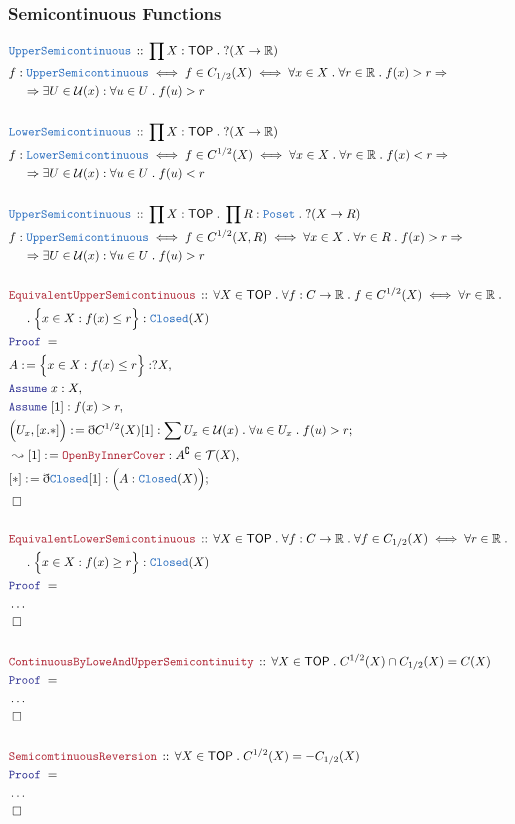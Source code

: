 \documentclass[12pt]{scrartcl}
\newcommand{\TYPE}[1]{\textcolor{NavyBlue}{\mathtt{#1}}}
\newcommand{\LOGIC}[1]{\textcolor{Blue}{\mathtt{#1}}}
\newcommand{\THM}[1]{\textcolor{Maroon}{\mathtt{#1}}}
\renewcommand{\.}{\; . \;}
\newcommand{\de}{: \kern 0.1pc =}
\newcommand{\Theorem}[2]{& \THM{#1} \, :: \, #2 \\ & \Proof = \\ }
\newcommand{\DeclareType}[2]{& \TYPE{#1} \, :: \, #2 \\}
\newcommand{\DefineNamedType}[4]{& #1 : \TYPE{#2} \iff #3 \iff #4 \\}
\newcommand{\NewLine}{\\ & \kern 1pc}
\newcommand{\Page}[1]{ \begin{align*} #1 \end{align*}   }
\newcommand{ \bd }{ \ByDef }
\newcommand{\NoProof}{ & \ldots \\ \EndProof}
\newcommand{\Imply}{\Rightarrow}
\newcommand{\Reals}{\mathbb{R} }
\renewcommand{\c}{\complement}
\newcommand{\Say}[3]{& #1 \de #2 : #3, \\}
\newcommand{\Conclude}[3]{& #1 \de #2 : #3; \\}
\newcommand{\Derive}[3]{& \leadsto #1 \de #2 : #3, \\}
\newcommand{\Assume}[2]{& \LOGIC{Assume} \; #1 : #2, \\}
\newcommand{\QED}{\; \square}
\newcommand{\EndProof}{& \QED \\}
\newcommand{\ByDef}{\eth}
\newcommand{\Proof}{\LOGIC{Proof} \; }
\newcommand{\TOP}{\mathsf{TOP}}
\newcommand{\T}{\mathcal{T}}
\newcommand{\U}{\mathcal{U}}
\begin{document}
\subsubsection{Semicontinuous Functions}
\Page{
	\DeclareType{UpperSemicontinuous}
	{
		\prod X : \TOP \. ?(X \to \Reals)
	}
	\DefineNamedType{f}{UpperSemicontinuous}{f \in C_{1/2}(X) }
	{
		\forall x \in X \. \forall r \in \Reals \. 
		f(x) > r  \Imply \NewLine \Imply \exists U \in \U(x) : \forall u \in U \. f(u) > r
	}
	\\
	\DeclareType{LowerSemicontinuous}
	{
		\prod X : \TOP \. ?(X \to \Reals)
	}
	\DefineNamedType{f}{LowerSemicontinuous}{f \in C^{1/2}(X) }
	{
		\forall x \in X \. \forall r \in \Reals \. 
		f(x) < r  \Imply \NewLine \Imply \exists U \in \U(x) : \forall u \in U \. f(u) < r
	}
	\\
	\DeclareType{UpperSemicontinuous}
	{
		\prod X : \TOP \. \prod R : \TYPE{Poset} \.  ?(X \to R)
	}
	\DefineNamedType{f}{UpperSemicontinuous}{f \in C^{1/2}(X,R) }
	{
		\forall x \in X \. \forall r \in R \. 
		f(x) > r  \Imply \NewLine \Imply \exists U \in \U(x) : \forall u \in U \. f(u) > r
	}
	\\
	\Theorem{EquivalentUpperSemicontinuous}
	{
		\forall X \in \TOP \. \forall f : C \to \Reals \.
		 f \in C^{1/2}(X) \iff
		\forall r \in \Reals  \. \NewLine \. 
		\Big\{ x \in X :  f(x) \le r \Big\} : \TYPE{Closed}(X)
	}
	\Say{A}{\Big\{ x \in X : f(x) \le r \Big\}}{?X}
	\Assume{x}{ X  }
	\Assume{[1]}{f(x) > r}
	\Conclude{\Big( U_x,[x.*]\Big)}{\bd C^{1/2}(X)[1]}{\sum U_x \in \U(x) \. \forall u \in U_x \. f(u) > r}
	\Derive{[1]}{\THM{OpenByInnerCover}}{A^\c \in \T(X)}
	\Conclude{[*]}{\bd \TYPE{Closed}[1]}{\Big( A : \TYPE{Closed}(X) \Big)}
	\EndProof
	\\
	\Theorem{EquivalentLowerSemicontinuous}
	{
		\forall X \in \TOP \. \forall f : C \to \Reals \.
		\forall f \in C_{1/2}(X) \iff
		\forall r \in \Reals  \. \NewLine \. 
		\Big\{ x \in X :  f(x) \ge r \Big\} : \TYPE{Closed}(X)
	}
	\NoProof
	\\
	\Theorem{ContinuousByLoweAndUpperSemicontinuity}
	{
		\forall X \in \TOP \.
		 C^{1/2}(X) \cap  C_{1/2}(X) = C(X)
	}
	\NoProof
	\\
	\Theorem{SemicomtinuousReversion}
	{
		\forall X \in \TOP \.
		C^{1/2}(X) = - C_{1/2}(X)
	}
	\NoProof
}
\end{document}
